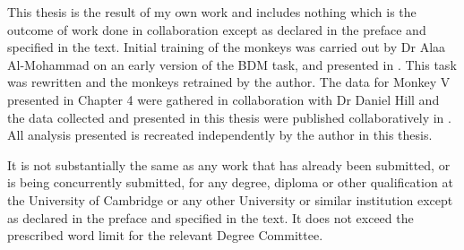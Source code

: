 
\begin{declaration}

This thesis is the result of my own work and includes nothing which is the outcome of work done in collaboration except as declared in the preface and specified in the text. Initial training of the monkeys was carried out by Dr Alaa Al-Mohammad on an early version of the BDM task, and presented in \cite{almohammadRewardValueRevealed2022}. This task was rewritten and the monkeys retrained by the author. The data for Monkey V presented in Chapter 4 were gathered in collaboration with Dr Daniel Hill and the data collected and presented in this thesis were published collaboratively in \cite{Hill2024-my}. All analysis presented is recreated independently by the author in this thesis.

It is not substantially the same as any work that has already been submitted, or is being concurrently submitted, for any degree, diploma or other qualification at the University of Cambridge or any other University or similar institution except as declared in the preface and specified in the text. It does not exceed the prescribed word limit for the relevant Degree Committee.


\end{declaration}
